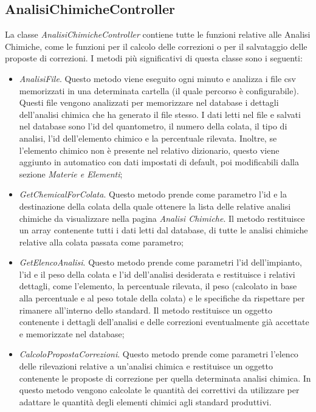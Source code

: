   \subsection{AnalisiChimicheController}
  La classe \textit{AnalisiChimicheController} contiene tutte le funzioni relative alle Analisi Chimiche, come le funzioni per
  il calcolo delle correzioni o per il salvataggio delle proposte di correzioni. I metodi più significativi di questa classe
  sono i seguenti:
  \begin{itemize}
    \item \textit{AnalisiFile}. Questo metodo viene eseguito ogni minuto e analizza i file csv memorizzati in una determinata
    cartella (il quale percorso è configurabile). Questi file vengono analizzati per memorizzare nel database i dettagli
    dell'analisi chimica che ha generato il file stesso. I dati letti nel file e salvati nel database sono
    l'id del quantometro, il numero della colata, il tipo di analisi, l'id dell'elemento chimico e la percentuale rilevata.
    Inoltre, se l'elemento chimico non è presente nel relativo dizionario, questo viene aggiunto in automatico con dati
    impostati di default, poi modificabili dalla sezione \textit{Materie e Elementi};
    \item \textit{GetChemicalForColata}. Questo metodo prende come parametro l'id e la destinazione della colata della
    quale ottenere la lista delle relative analisi chimiche da visualizzare nella pagina \textit{Analisi Chimiche}.
    Il metodo restituisce un array contenente tutti i dati letti dal database, di tutte le analisi chimiche relative alla
    colata passata come parametro;
    \item \textit{GetElencoAnalisi}. Questo metodo prende come parametri l'id dell'impianto, l'id e il peso della colata e
    l'id dell'analisi desiderata e restituisce i relativi dettagli, come l'elemento, la percentuale rilevata, il peso
    (calcolato in base alla percentuale e al peso totale della colata) e le specifiche da rispettare per rimanere
    all'interno dello standard. Il metodo restituisce un oggetto contenente i dettagli dell'analisi e delle
    correzioni eventualmente già accettate e memorizzate nel database;
    \item \textit{CalcoloPropostaCorrezioni}. Questo metodo prende come parametri l'elenco delle rilevazioni relative a
    un'analisi chimica e restituisce un oggetto contenente le proposte di correzione per quella determinata analisi chimica.
    In questo metodo vengono calcolate le quantità dei correttivi da utilizzare per adattare le quantità degli
    elementi chimici agli standard produttivi.
  \end{itemize}

